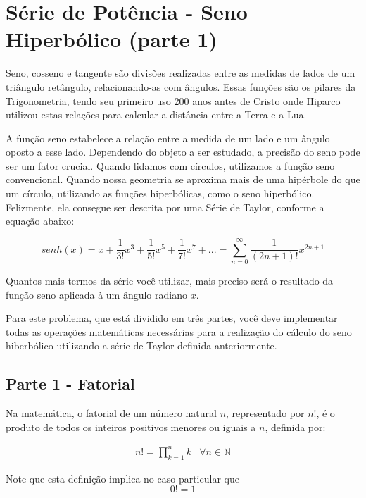 \section{Série de Potência - Seno Hiperbólico (parte 1)}
Seno, cosseno e tangente são divisões realizadas entre as medidas de lados de um triângulo retângulo, relacionando-as com ângulos. Essas funções são os pilares da Trigonometria, tendo seu primeiro uso 200 anos antes de Cristo onde Hiparco utilizou estas relações para calcular a distância entre a Terra e a Lua. 

A função seno estabelece a relação entre a medida de um lado e um ângulo oposto a esse lado. Dependendo do objeto a ser estudado, a precisão do seno pode ser um fator crucial. Quando lidamos com círculos, utilizamos a função seno convencional. Quando nossa geometria se aproxima mais de uma hipérbole do que um círculo, utilizando as funções hiperbólicas, como o seno hiperbólico. Felizmente, ela consegue ser descrita por uma Série de Taylor, conforme a equação abaixo:

\begin{equation*}
	senh(x) = x + \frac{1}{3!}x^3 + \frac{1}{5!}x^5+\frac{1}{7!}x^7+...=\sum_{n = 0}^{\infty }\frac{1}{(2n + 1)!}x^{2n + 1}
\end{equation*}

Quantos mais termos da série você utilizar, mais preciso será o resultado da função seno aplicada à um ângulo radiano $x$.


Para este problema, que está dividido em três partes, você deve implementar todas as operações matemáticas necessárias para a realização do cálculo do seno hiberbólico utilizando a série de Taylor definida anteriormente.
\subsection*{Parte 1 - Fatorial}
Na matemática, o fatorial de um número natural $n$, representado por $n!$, é o produto de todos os inteiros positivos menores ou iguais a $n$, definida por:

\begin{equation*}
	\begin{matrix}
		n! = \prod_{k=1}^{n}k  & \forall n\in\mathbb{N}
	\end{matrix}
\end{equation*}

Note que esta definição implica no caso particular que
\begin{equation*}
	0! = 1
\end{equation*}

